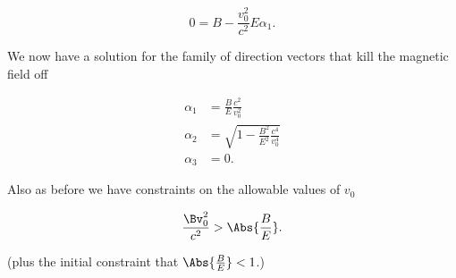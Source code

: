 \begin{equation}\label{eqn:relElectroDynProblemSet3:1760}
0 = B - \frac{v_0^2}{c^2} E \alpha_1.
\end{equation}

We now have a solution for the family of direction vectors that kill the magnetic field off

\begin{align}\label{eqn:relElectroDynProblemSet3:1780}
\alpha_1 &= \frac{B}{E} \frac{c^2}{v_0^2} \\
\alpha_2 &= \sqrt{ 1 - \frac{B^2}{E^2} \frac{c^4}{v_0^4} } \\
\alpha_3 &= 0.
\end{align}

Also as before we have constraints on the allowable values of $v_0$

\begin{equation}\label{eqn:relElectroDynProblemSet3:1800}
\frac{\Bv_0^2}{c^2} > \Abs{\frac{B}{E}}.
\end{equation}

(plus the initial constraint that $\Abs{\frac{B}{E}} < 1$.)
